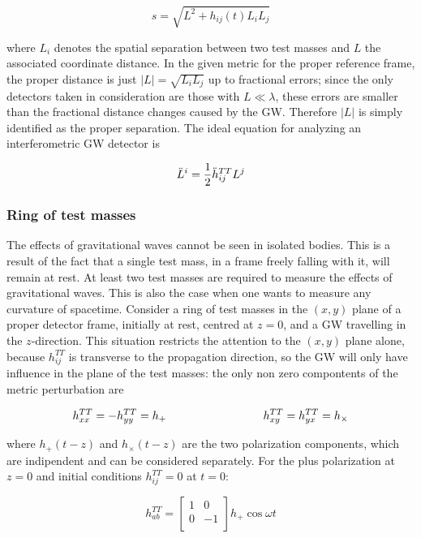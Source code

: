 \documentclass[binding=0.6cm, LaM]{sapthesis}
\begin{document}
		\begin{equation}
		s = \sqrt{L^2 + h_{ij}(t)L_{i}L_{j}}
		\end{equation}

	where $L_i$ denotes the spatial separation between two test masses and $L$ the associated coordinate distance.
	In the given metric for the proper reference frame, the proper distance is just $|L| = \sqrt{L_iL_j}$ up to fractional errors; 
	since the only detectors taken in consideration are those
	with $L \ll \lambda$, these errors are smaller than the fractional distance changes caused by the GW.
	Therefore $|L|$ is simply identified as the proper separation. The ideal equation for analyzing an interferometric GW detector is

		\begin{equation}
		{\ddot L}^i = {1 \over 2}{\ddot h}_{ij}^{TT}L^j
		\end{equation}


\subsubsection{Ring of test masses}

	The effects of gravitational waves cannot be seen in isolated bodies. 
	This is a result of the fact that a single test mass, in a frame freely falling with it, 
	will remain at rest. At least two test masses are required to measure the effects of gravitational waves. 
	This is also the case when one wants to measure any curvature of spacetime.
	Consider a ring of test masses in the $(x, y)$ plane of a proper detector frame, initially at rest, centred at $z = 0$, 
	and a GW travelling in the $z$-direction.
	This situation restricts the attention to the $(x,y)$ plane alone, because $h_{ij}^{TT}$ is transverse to the propagation direction, 
	so the GW will only have influence in the plane of the test masses:
	the only non zero compontents of the metric perturbation are

		\begin{equation}
		h_{xx}^{TT} = - h_{yy}^{TT} = h_{+} \hspace*{3cm} h_{xy}^{TT} = h_{yx}^{TT} = h_{\times}
		\end{equation}

	where $h_{+}(t-z)$ and $h_{\times}(t-z)$ are the two polarization components, which are indipendent and can be considered separately.
	For the plus polarization at $z=0$ and initial conditions $h_{ij}^{TT} = 0$ at $t=0$:

		\begin{equation}
		h_{ab}^{TT} = 
		\begin{bmatrix}
		1  & 0 \\
		0 &  -1 \\
		\end{bmatrix} 
		h_{+}\cos \omega t
		\end{equation}
\end{document}
